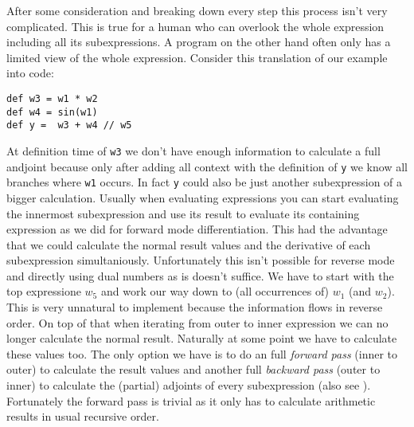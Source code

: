 After some consideration and breaking down every step this process isn't very complicated. This is true for a human who can overlook the whole expression including all its subexpressions. A program on the other hand often only has a limited view of the whole expression. Consider this translation of our example into code:
\begin{lstlisting}
def w3 = w1 * w2
def w4 = sin(w1)
def y =  w3 + w4 // w5
\end{lstlisting}
At definition time of \lstinline{w3} we don't have enough information to calculate a full andjoint because only after adding all context with the definition of \lstinline{y} we know all branches where \lstinline{w1} occurs. In fact \lstinline{y} could also be just another subexpression of a bigger calculation. Usually when evaluating expressions you can start evaluating the innermost subexpression and use its result to evaluate its containing expression as we did for forward mode differentiation. This had the advantage that we could calculate the normal result values and the derivative of each subexpression simultaniously. Unfortunately this isn't possible for reverse mode and directly using dual numbers as is doesn't suffice. We have to start with the top expressione $w_5$ and work our way down to (all occurrences of) $w_1$ (and $w_2$). This is very unnatural to implement because the information flows in reverse order. On top of that when iterating from outer to inner expression we can no longer calculate the normal result. Naturally at some point we have to calculate these values too. The only option we have is to do an full \emph{forward pass} (inner to outer) to calculate the result values and another full \emph{backward pass} (outer to inner) to calculate the (partial) adjoints of every subexpression (also see ). Fortunately the forward pass is trivial as it only has to calculate arithmetic results in usual recursive order.

